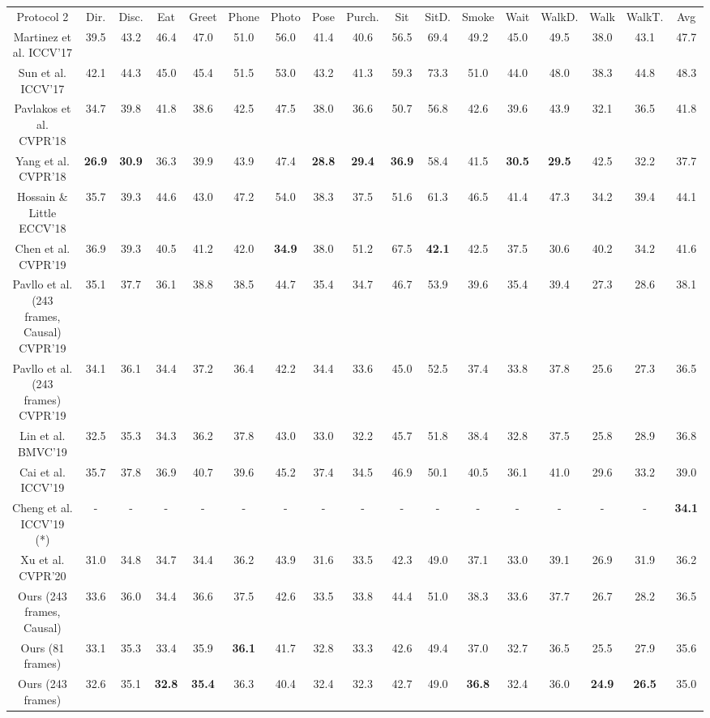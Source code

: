 \documentclass[journal]{IEEEtran}
\begin{document}
\begin{table*}[htbp]
\begin{threeparttable}
{\begin{tabular}{|c|c|c|c|c|c|c|c|c|c|c|c|c|c|c|c|c|}
    
    Protocol 2&Dir.&Disc.&Eat&Greet&Phone&Photo&Pose&Purch.&Sit&SitD.&Smoke&Wait&WalkD.&Walk&WalkT.&Avg \\
    Martinez et al. \cite{martinez2017simple} ICCV'17 &39.5 &43.2 &46.4 &47.0 &51.0 &56.0 &41.4 &40.6 &56.5 &69.4 &49.2 &45.0 &49.5 &38.0 &43.1 &47.7 \\
    Sun et al. \cite{sun2017compositional} ICCV'17 &42.1 &44.3 &45.0 &45.4 &51.5 &53.0 &43.2 &41.3 &59.3 &73.3 &51.0 &44.0 &48.0 &38.3 &44.8 &48.3 \\
Pavlakos et al. \cite{pavlakos2018ordinal} CVPR'18 &34.7 &39.8 &41.8 &38.6 &42.5 &47.5 &38.0 &36.6 &50.7 &56.8 &42.6 &39.6 &43.9 &32.1 &36.5 &41.8 \\
    Yang et al. \cite{yang20183d} CVPR’18 &\textbf{26.9} &\textbf{30.9} &36.3 &39.9 &43.9 &47.4 &\textbf{28.8} &\textbf{29.4} &\textbf{36.9} &58.4 &41.5 &\textbf{30.5} &\textbf{29.5} &42.5 &32.2 &37.7 \\
    Hossain \& Little \cite{rayat2018exploiting} ECCV'18 &35.7 &39.3 &44.6 &43.0 &47.2 &54.0 &38.3 &37.5 &51.6 &61.3 &46.5 &41.4 &47.3 &34.2 &39.4 &44.1 \\
    Chen et al. \cite{chen2019weakly} CVPR'19 &36.9 &39.3 &40.5 &41.2 &42.0 &\textbf{34.9} &38.0 &51.2 &67.5 &\textbf{42.1} &42.5 &37.5 &30.6 &40.2 &34.2 &41.6 \\
    Pavllo et al. \cite{pavllo20193d} (243 frames, Causal) CVPR'19 &35.1&37.7&36.1&38.8&38.5&44.7&35.4&34.7&46.7&53.9&39.6&35.4&39.4&27.3&28.6&38.1\\
    Pavllo et al. \cite{pavllo20193d} (243 frames) CVPR'19 &34.1 &36.1 &34.4 &37.2 &36.4 &42.2 &34.4 &33.6 &45.0 &52.5 &37.4 &33.8 &37.8 &25.6 &27.3 &36.5\\ 
    Lin et al. \cite{lin2019trajectory} BMVC'19 &32.5&35.3&34.3&36.2&37.8&43.0&33.0&32.2&45.7&51.8&38.4&32.8&37.5&25.8&28.9&36.8\\
    Cai et al. \cite{cai2019exploiting} ICCV'19 &35.7 &37.8 &36.9 &40.7 &39.6 &45.2 &37.4 &34.5 &46.9 &50.1 &40.5 &36.1 &41.0 &29.6 &33.2 &39.0\\
    Cheng et al. \cite{cheng2019occlusion} ICCV'19 (*) &- &- &- &- &- &- &- &- &- &- &- &- &- &- &- &\textbf{34.1}\\
    Xu et al. \cite{xu2020deep} CVPR'20 &31.0 &34.8 &34.7 &34.4 &36.2 &43.9 &31.6 &33.5 &42.3 &49.0 &37.1 &33.0 &39.1 &26.9 &31.9 &36.2 \\
    \cline{1-17}
    Ours (243 frames, Causal) &33.6&36.0&34.4&36.6&37.5&42.6&33.5&33.8&44.4&51.0&38.3&33.6&37.7&26.7&28.2&36.5\\
    Ours (81 frames) &33.1 &35.3 &33.4 &35.9 &\textbf{36.1} &41.7 &32.8 &33.3 &42.6 &49.4 &37.0 &32.7 &36.5 &25.5 &27.9 &35.6 \\
    Ours (243 frames) &32.6 &35.1 &\textbf{32.8} &\textbf{35.4} &36.3 &40.4 &32.4 &32.3 &42.7 &49.0 &\textbf{36.8} &32.4 &36.0 &\textbf{24.9} &\textbf{26.5} &35.0 \\ \cline{1-17}



\end{tabular}}
\end{threeparttable}
\end{table*}
\end{document}

